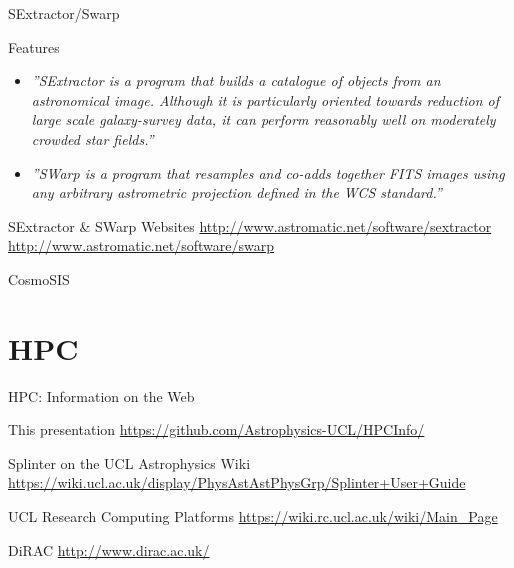 \documentclass{beamer}
\begin{document}
\begin{frame}{SExtractor/Swarp}
  \begin{block}{Features}
   \begin{itemize}
    \item{\textit{''SExtractor is a program that builds a catalogue of objects from an astronomical image. Although it is particularly oriented towards reduction of large scale galaxy-survey data, it can perform reasonably well on moderately crowded star fields.''}}
    \item{\textit{''SWarp is a program that resamples and co-adds together FITS images using any arbitrary astrometric projection defined in the WCS standard.''}}
   \end{itemize}
  \end{block}
  \begin{block}{SExtractor \& SWarp Websites}
    \url{http://www.astromatic.net/software/sextractor}\\
    \url{http://www.astromatic.net/software/swarp}
  \end{block}
\end{frame}

\begin{frame}{CosmoSIS}

\end{frame}

\section{HPC}

\begin{frame}{HPC: Information on the Web}
  \begin{block}{This presentation}
    \url{https://github.com/Astrophysics-UCL/HPCInfo/}
  \end{block}

    \begin{block}{Splinter on the UCL Astrophysics Wiki}
    \url{https://wiki.ucl.ac.uk/display/PhysAstAstPhysGrp/Splinter+User+Guide}
  \end{block}

  \begin{block}{UCL Research Computing Platforms}
    \url{https://wiki.rc.ucl.ac.uk/wiki/Main_Page}
  \end{block}

  \begin{block}{DiRAC}
    \url{http://www.dirac.ac.uk/}
  \end{block}

\end{frame}
\end{document}
